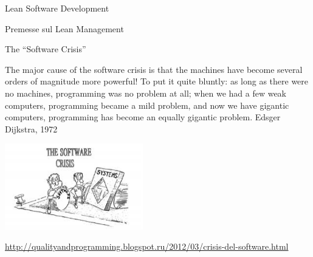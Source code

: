 \documentclass{beamer}
\begin{document}

\begin{frame}{\centerline{Lean Software Development}}
\begin{center}
\LARGE
Premesse sul Lean Management
\end{center}
\end{frame}

\begin{frame}{\centerline{The ``Software Crisis''}}
The major cause of the software crisis is that the machines have become several orders of magnitude more powerful! To put it quite bluntly: as long as there were no machines, programming was no problem at all; when we had a few weak computers, programming became a mild problem, and now we have gigantic computers, programming has become an equally gigantic problem.
Edsger Dijkstra, 1972

\begin{center}
\includegraphics[width=60mm]{A2022.IDSEPC.ProcessoDiProduzione/pic-01.png}
\end{center}



\begin{center}
\tiny
\url{http://qualityandprogramming.blogspot.ru/2012/03/crisis-del-software.html}
\end{center}

\end{frame}
\end{document}
